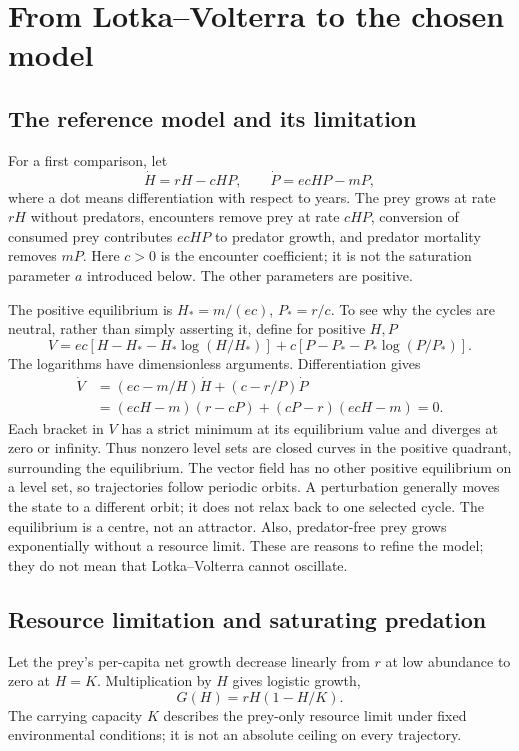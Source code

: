 \section{From Lotka--Volterra to the chosen model}
\subsection{The reference model and its limitation}
For a first comparison, let
\begin{equation}\label{eq:arnav_lv}
\dot H=rH-cHP,\qquad \dot P=ecHP-mP,
\end{equation}
where a dot means differentiation with respect to years. The prey grows at rate
$rH$ without predators, encounters remove prey at rate $cHP$, conversion of consumed
prey contributes $ecHP$ to predator growth, and predator mortality removes $mP$.
Here $c>0$ is the encounter coefficient; it is not the saturation parameter $a$
introduced below. The other parameters are positive.

The positive equilibrium is $H_*=m/(ec)$, $P_*=r/c$. To see why the cycles are
neutral, rather than simply asserting it, define for positive $H,P$
\begin{equation}
V=ec\left[H-H_*-H_*\log(H/H_*)\right]
 +c\left[P-P_*-P_*\log(P/P_*)\right].
\end{equation}
The logarithms have dimensionless arguments. Differentiation gives
\begin{align}
\dot V&=(ec-m/H)\dot H+(c-r/P)\dot P\\
&=(ecH-m)(r-cP)+(cP-r)(ecH-m)=0.
\end{align}
Each bracket in $V$ has a strict minimum at its equilibrium value and diverges at
zero or infinity. Thus nonzero level sets are closed curves in the positive
quadrant, surrounding the equilibrium. The vector field has no other positive
equilibrium on a level set, so trajectories follow periodic orbits. A perturbation
generally moves the state to a different orbit; it does not relax back to one
selected cycle. The equilibrium is a centre, not an attractor. Also, predator-free
prey grows exponentially without a resource limit. These are reasons to refine the
model; they do not mean that Lotka--Volterra cannot oscillate.

\subsection{Resource limitation and saturating predation}
Let the prey's per-capita net growth decrease linearly from $r$ at low abundance
to zero at $H=K$. Multiplication by $H$ gives logistic growth,
\begin{equation}
G(H)=rH(1-H/K).
\end{equation}
The carrying capacity $K$ describes the prey-only resource limit under fixed
environmental conditions; it is not an absolute ceiling on every trajectory.

